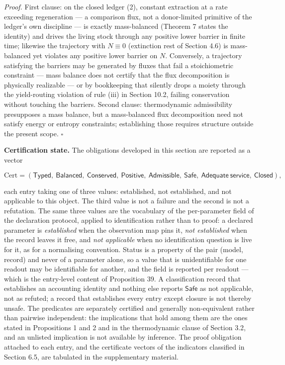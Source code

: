 \documentclass[11pt]{article}
\begin{document}
\emph{Proof.} First clause: on the closed ledger (2), constant extraction at a rate exceeding regeneration --- a comparison flux, not a donor-limited primitive of the ledger's own discipline --- is exactly mass-balanced (Theorem 7 states the identity) and drives the living stock through any positive lower barrier in finite time; likewise the trajectory with \(N \equiv 0\) (extinction rest of Section 4.6) is mass-balanced yet violates any positive lower barrier on \(N\). Conversely, a trajectory satisfying the barriers may be generated by fluxes that fail a stoichiometric constraint --- mass balance does not certify that the flux decomposition is physically realizable --- or by bookkeeping that silently drops a moiety through the yield-routing violation of rule (iii) in Section 10.2, failing conservation without touching the barriers. Second clause: thermodynamic admissibility presupposes a mass balance, but a mass-balanced flux decomposition need not satisfy energy or entropy constraints; establishing those requires structure outside the present scope. \(\square\)

\textbf{Certification state.} The obligations developed in this section are reported as a vector 

$$\mathrm{Cert}=(\mathsf{Typed},\ \mathsf{Balanced},\ \mathsf{Conserved},\ \mathsf{Positive},\ \mathsf{Admissible},\ \mathsf{Safe},\ \mathsf{Adequate\ service},\ \mathsf{Closed}),$$

 each entry taking one of three values: established, not established, and not applicable to this object. The third value is not a failure and the second is not a refutation. The same three values are the vocabulary of the per-parameter field of the declaration protocol, applied to identification rather than to proof: a declared parameter is \emph{established} when the observation map pins it, \emph{not established} when the record leaves it free, and \emph{not applicable} when no identification question is live for it, as for a normalising convention. Status is a property of the pair (model, record) and never of a parameter alone, so a value that is unidentifiable for one readout may be identifiable for another, and the field is reported per readout --- which is the entry-level content of Proposition 39. A classification record that establishes an accounting identity and nothing else reports \(\mathsf{Safe}\) as not applicable, not as refuted; a record that establishes every entry except closure is not thereby unsafe. The predicates are separately certified and generally non-equivalent rather than pairwise independent: the implications that hold among them are the ones stated in Propositions 1 and 2 and in the thermodynamic clause of Section 3.2, and an unlisted implication is not available by inference. The proof obligation attached to each entry, and the certificate vectors of the indicators classified in Section 6.5, are tabulated in the supplementary material.
\end{document}
